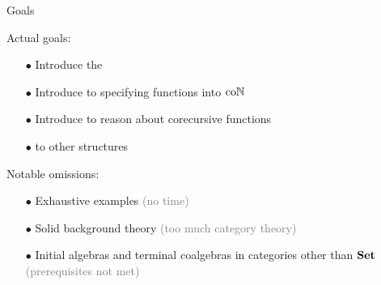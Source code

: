 \begin{frame}{Goals}
  
  \par Actual goals:
  \begin{itemize}[nosep]
    \item[$\bullet$] Introduce the 
    \item[$\bullet$] Introduce  to specifying functions into $\mathrm{co}\mathbb{N}$
    \item[$\bullet$] Introduce  to reason about corecursive functions
    \item[$\bullet$]  to other structures
  \end{itemize}

  \vspace{\baselineskip}

  \par Notable omissions:
  \begin{itemize}[nosep]
    \item[$\bullet$] Exhaustive examples \textcolor{gray}{(no time)}
    \item[$\bullet$] Solid background theory \textcolor{gray}{(too much category theory)}
    \item[$\bullet$] Initial algebras and terminal coalgebras in categories other than $\operatorname{\mathbf{Set}}$ \textcolor{gray}{(prerequisites not met)}
  \end{itemize}

\end{frame}

